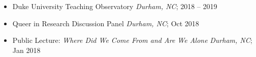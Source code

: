 \begin{itemize}
    \item Duke University Teaching Observatory \hfill \textit{Durham, NC}; 2018 -- 2019

    \item Queer in Research Discussion Panel \hfill \textit{Durham, NC}; Oct 2018

    \item Public Lecture: \textit{Where Did We Come From and Are We Alone} \hfill \textit{Durham, NC}; Jan 2018
\end{itemize}